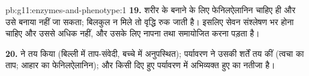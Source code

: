 \begin{solution}{pb:g11:enzymes-and-phenotype:1}
\textbf{19.} शरीर के  बनाने के लिए फेनिलऐलानिन चाहिए ही और उसे बनाया
नहीं जा सकता; बिलकुल न मिले तो वृद्धि रुक जाती है। इसलिए सेवन 
संश्लेषण भर होना चाहिए और उससे अधिक नहीं, और उसके लिए नापना तथा समायोजित
करना पड़ता है।

\textbf{20.}  ने  तय किया (बिल्ली में ताप-संवेदी, बच्चे में
अनुपस्थित); पर्यावरण ने उसकी शर्तें तय कीं (त्वचा का ताप; आहार का
फेनिलऐलानिन); और  किसी दिए हुए पर्यावरण में अभिव्यक्त हुए
 का नतीजा है।
\end{solution}
